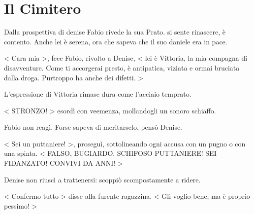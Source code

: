 \chapter{Il Cimitero}

Dalla prospettiva di denise
Fabio rivede la sua Prato. si sente rinascere, è contento. Anche lei è serena, ora che sapeva che il suo daniele era in pace.

< Cara mia >, fece Fabio, rivolto a Denise, < lei è Vittoria, la mia compagna di disavventure. Come ti accorgerai presto, è antipatica, viziata e ormai bruciata dalla droga. Purtroppo ha anche dei difetti. >

L'espressione di Vittoria rimase dura come l'acciaio temprato.

< STRONZO! > esordì con veemenza, mollandogli un sonoro schiaffo.

Fabio non reagì. Forse sapeva di meritarselo, pensò Denise.

< Sei un puttaniere! >, proseguì, sottolineando ogni accusa con un pugno o con una spinta. < FALSO, BUGIARDO, SCHIFOSO PUTTANIERE! SEI FIDANZATO! CONVIVI DA ANNI! >

Denise non riuscì a trattenersi: scoppiò scompostamente a ridere.

< Confermo tutto > disse alla furente ragazzina. < Gli voglio bene, ma è proprio pessimo! >

